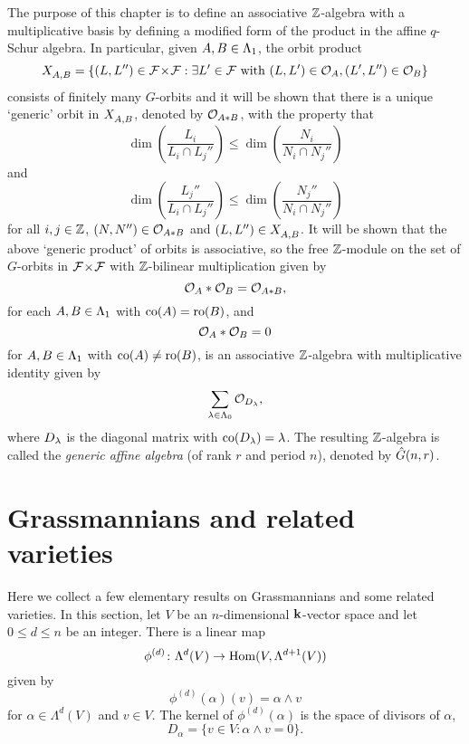 \documentclass[a4paper, 11pt]{report}
\begin{document}
The purpose of this chapter is to define an associative $\mathbb{Z}$-algebra with a multiplicative basis by defining a modified form of the product in the affine $q$-Schur algebra. In particular, given $A,B\in\Lambda_1{}$, the orbit product
\begin{equation*}
X_{A,B}^{} = \{(L,L'')\in{\mathcal{F}\!\times\!\mathcal{F}}: \exists L'\in\mathcal{F}\text{ with } (L,L')\in\mathcal{O}_{A}, (L',L'')\in\mathcal{O}_{B}\}
\end{equation*}
consists of finitely many $G$-orbits and it will be shown that there is a unique `generic' orbit in $X_{A,B}^{}$, denoted by $\mathcal{O}_{A\ast B}$, with the property that
\begin{equation*}
\dim\left(\frac{L_i}{L_i\cap L_j''}\right)\le\dim\left(\frac{N_i}{N_i\cap N_j''}\right)
\end{equation*}
and
\begin{equation*}
\dim\left(\frac{L_j''}{L_i\cap L_j''}\right)\le\dim\left(\frac{N_j''}{N_i\cap N_j''}\right)
\end{equation*}
for all $i,j\in\mathbb{Z}$, $(N,N'')\in\mathcal{O}_{A\ast B}$ and $(L,L'')\in X_{A,B}^{}$. It will be shown that the above `generic product' of orbits is associative, so the free $\mathbb{Z}$-module on the set of $G$-orbits in ${\mathcal{F}\!\times\!\mathcal{F}}$ with $\mathbb{Z}$-bilinear multiplication given by
\begin{equation*}
\mathcal{O}_{A}\ast\mathcal{O}_{B}=\mathcal{O}_{A\ast B},
\end{equation*}
for each $A,B\in\Lambda_1{}$ with $\operatorname{co}(A)=\operatorname{ro}(B)$, and
\begin{equation*}
\mathcal{O}_{A}\ast\mathcal{O}_{B} = 0
\end{equation*}
for $A,B\in\Lambda_1{}$ with $\operatorname{co}(A)\neq\operatorname{ro}(B)$, is an associative $\mathbb{Z}$-algebra with multiplicative identity given by
\begin{equation*}
\sum_{\lambda\in\Lambda_0{}} \mathcal{O}_{D_{\lambda}},
\end{equation*}
where $D_{\lambda}$ is the diagonal matrix with $\operatorname{co}(D_{\lambda})=\lambda$. The resulting $\mathbb{Z}$-algebra is called the \emph{generic affine algebra} (of rank $r$ and period $n$), denoted by $\hat{G}(n,r)$.



\section{Grassmannians and related varieties}

Here we collect a few elementary results on Grassmannians and some related varieties. In this section, let $V$ be an $n$-dimensional $\mathbf{k}$-vector space and let $0\le d\le n$ be an integer. There is a linear map
\begin{equation*}
\phi^{(d)}\colon\Lambda^d(V)\to\operatorname{Hom}(V,\Lambda^{d+1}(V))
\end{equation*}
given by
\begin{equation*}
\phi^{(d)}(\alpha)(v)=\alpha\wedge v
\end{equation*}
for $\alpha\in\Lambda^d(V)$ and $v\in V$.
The kernel of $\phi^{(d)}(\alpha)$ is the space of divisors of $\alpha$,
\begin{equation*}
D_\alpha=\{v\in V:\alpha\wedge v=0\}.
\end{equation*}
\end{document}
